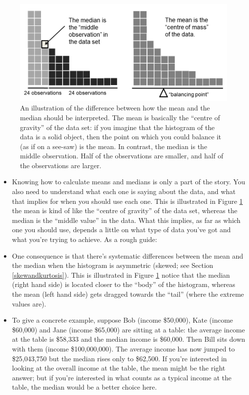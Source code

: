 \documentclass[
]{book}
\begin{document}
\begin{figure}
\centering
\includegraphics{./img/descriptives2/meanmedian.png}
\caption{\label{fig:meanmedian}An illustration of the difference between how the mean and the median should be interpreted. The mean is basically the ``centre of gravity'' of the data set: if you imagine that the histogram of the data is a solid object, then the point on which you could balance it (as if on a see-saw) is the mean. In contrast, the median is the middle observation. Half of the observations are smaller, and half of the observations are larger.}
\end{figure}

\begin{itemize}
\item
  Knowing how to calculate means and medians is only a part of the story. You also need to understand what each one is saying about the data, and what that implies for when you should use each one. This is illustrated in Figure \ref{fig:meanmedian} the mean is kind of like the ``centre of gravity'' of the data set, whereas the median is the ``middle value'' in the data. What this implies, as far as which one you should use, depends a little on what type of data you've got and what you're trying to achieve. As a rough guide:
\item
  One consequence is that there's systematic differences between the mean and the median when the histogram is asymmetric (skewed; see Section \ref{skewandkurtosis}). This is illustrated in Figure \ref{fig:meanmedian} notice that the median (right hand side) is located closer to the ``body'' of the histogram, whereas the mean (left hand side) gets dragged towards the ``tail'' (where the extreme values are).
\item
  To give a concrete example, suppose Bob (income \$50,000), Kate (income \$60,000) and Jane (income \$65,000) are sitting at a table: the average income at the table is \$58,333 and the median income is \$60,000. Then Bill sits down with them (income \$100,000,000). The average income has now jumped to \$25,043,750 but the median rises only to \$62,500. If you're interested in looking at the overall income at the table, the mean might be the right answer; but if you're interested in what counts as a typical income at the table, the median would be a better choice here.
\end{itemize}
\end{document}
